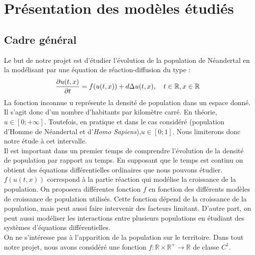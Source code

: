 \documentclass[a4paper,11pt]{article}
\begin{document}
\section{Présentation des modèles étudiés}
\subsection{Cadre général}
Le but de notre projet est d'étudier l'évolution de la population de Néandertal en la modélisant par une équation de réaction-diffusion du type : \\
\begin{equation}\label{EqGen}
\frac{\partial u(t,x)}{\partial t}=f(u(t,x))+d\Delta u(t,x), \quad t \in \mathbb{R}, x \in \mathbb{R} \\
\end{equation}
La fonction inconnue u représente la densité de population dans un espace donné. Il s'agit donc d'un nombre d'habitants par kilomètre carré. En théorie, $u\in [0;+\infty]$. Toutefois, en pratique et dans le cas considéré (population d'Homme de Néandertal et d'\textit{Homo Sapiens}),$u\in [0;1]$. Nous limiterons donc notre étude à cet intervalle.\\
\newline
Il est important dans un premier temps de comprendre l'évolution de la densité de population par rapport au temps. En supposant que le temps est continu on obtient des équations différentielles ordinaires que nous pouvons étudier. $f(u(t,x))$ correspond à la partie réaction qui modélise la croissance de la population. On proposera différentes fonction $f$ en fonction des différents modèles de croissance de population utilisés. Cette fonction dépend de la croissance de la population, mais peut aussi faire intervenir des facteurs limitant. D'autre part, on peut aussi modéliser les interactions entre plusieurs populations en étudiant des systèmes
d'équations différentielles.\\
\newline
On ne s'intéresse pas à l'apparition de la population sur le territoire. Dans tout notre projet, nous avons considéré une fonction $f: \mathbb{R} \times \mathbb{R}^+ \to \mathbb{R}$  de classe $C^1$. \\
\end{document}

